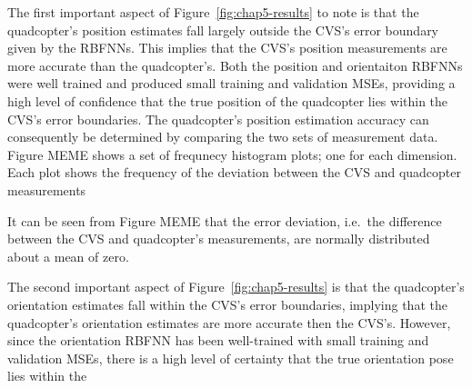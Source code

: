 The first important aspect of Figure~\ref{fig:chap5-results} to note is that the quadcopter's position estimates fall largely outside the CVS's error boundary given by the RBFNNs. This implies that the CVS's position measurements are more accurate than the quadcopter's. Both the position and orientaiton RBFNNs were well trained and produced small training and validation MSEs, providing a high level of confidence that the true position of the quadcopter lies within the CVS's error boundaries. The quadcopter's position estimation accuracy can consequently be determined by comparing the two sets of measurement data. Figure MEME shows a set of frequnecy histogram plots; one for each dimension. Each plot shows the frequency of the deviation between the CVS and quadcopter measurements

It can be seen from Figure MEME that the error deviation, i.e.\ the difference between the CVS and quadcopter's measurements, are normally distributed about a mean of zero. 

The second important aspect of Figure~\ref{fig:chap5-results} is that the quadcopter's orientation estimates fall within the CVS's error boundaries, implying that the quadcopter's orientation estimates are more accurate then the CVS's. However, since the orientation RBFNN has been well-trained with small training and validation MSEs, there is a high level of certainty that the true orientation pose lies within the 



